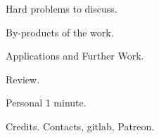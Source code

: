 \documentclass[presentation, CJK, compress]{beamer}
\begin{document}
\begin{frame}[label={sec:org2eebd5c}]{Hard problems to discuss.}
\end{frame}

\begin{frame}[label={sec:org82ed5f9}]{By-products of the work.}
\end{frame}

\begin{frame}[label={sec:org70bd427}]{Applications and Further Work.}
\end{frame}

\begin{frame}[label={sec:org52d2399}]{Review.}
\end{frame}

\begin{frame}[label={sec:orgb0b4a1c}]{Personal 1 minute.}
\end{frame}

\begin{frame}[label={sec:org37c6f5c}]{Credits.}
Contacts, gitlab, Patreon.
\end{frame}
\end{document}
